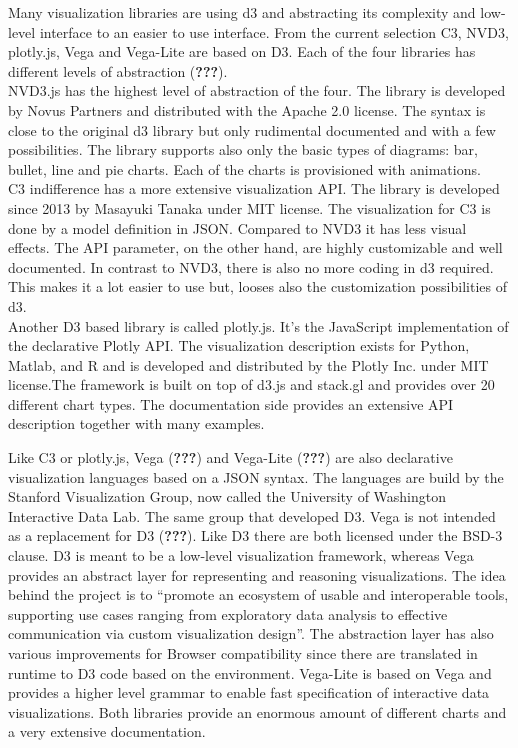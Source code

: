 \documentclass[american,a4paper,oneside,,tablecaptionabove]{scrbook}
\begin{document}
Many visualization libraries are using d3 and abstracting its complexity
and low-level interface to an easier to use interface. From the current
selection C3, NVD3, plotly.js, Vega and Vega-Lite are based on D3. Each
of the four libraries has different levels of abstraction
({\textbf{???}}).\\
NVD3.js has the highest level of abstraction of the four. The library is
developed by Novus Partners and distributed with the Apache 2.0 license.
The syntax is close to the original d3 library but only rudimental
documented and with a few possibilities. The library supports also only
the basic types of diagrams: bar, bullet, line and pie charts. Each of
the charts is provisioned with animations.\\
C3 indifference has a more extensive visualization API. The library is
developed since 2013 by Masayuki Tanaka under MIT license. The
visualization for C3 is done by a model definition in JSON. Compared to
NVD3 it has less visual effects. The API parameter, on the other hand,
are highly customizable and well documented. In contrast to NVD3, there
is also no more coding in d3 required. This makes it a lot easier to use
but, looses also the customization possibilities of d3.\\
Another D3 based library is called plotly.js. It's the JavaScript
implementation of the declarative Plotly API. The visualization
description exists for Python, Matlab, and R and is developed and
distributed by the Plotly Inc. under MIT license.The framework is built
on top of d3.js and stack.gl and provides over 20 different chart types.
The documentation side provides an extensive API description together
with many examples.

Like C3 or plotly.js, Vega ({\textbf{???}}) and Vega-Lite
({\textbf{???}}) are also declarative visualization languages based on a
JSON syntax. The languages are build by the Stanford Visualization
Group, now called the University of Washington Interactive Data Lab. The
same group that developed D3. Vega is not intended as a replacement for
D3 ({\textbf{???}}). Like D3 there are both licensed under the BSD-3
clause. D3 is meant to be a low-level visualization framework, whereas
Vega provides an abstract layer for representing and reasoning
visualizations. The idea behind the project is to \enquote{promote an
ecosystem of usable and interoperable tools, supporting use cases
ranging from exploratory data analysis to effective communication via
custom visualization design}. The abstraction layer has also various
improvements for Browser compatibility since there are translated in
runtime to D3 code based on the environment. Vega-Lite is based on Vega
and provides a higher level grammar to enable fast specification of
interactive data visualizations. Both libraries provide an enormous
amount of different charts and a very extensive documentation.
\end{document}
